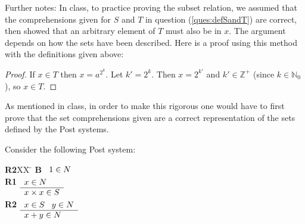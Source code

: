 \documentclass[]{exam}
\theoremstyle{definition}
\newcommand{\bb}[1]{\mathbb{#1}}
\newcommand{\Z}{\bb{Z}}
\newcommand{\N}{\bb{N}}
\begin{document}
\begin{questions}
\begin{parts}
\begin{solution}
Further notes: In class, to practice proving the subset relation, we assumed that the
comprehensions given for $S$ and $T$ in question (\ref{ques:defSandT}) are 
correct, then showed that an arbitrary element of $T$ must also be in $x$.
The argument depends on how the sets have been described. Here is a proof
using this method with the definitions given above:
\begin{proof}
If $x \in T$ then $x = a^{2^k}$. Let $k' = 2^k$. Then $x = 2^{k'}$ and 
$k' \in \Z^+$ (since $k \in \N_0$), so $x \in T$.
\end{proof}
As mentioned in class, in order to make this rigorous one would
have to first prove that the set comprehensions given are a correct representation
of the sets defined by the Post systems.
  
\end{solution}
\end{parts}

\question Consider the following Post system:

\begin{tabbing}
{\bf R2}XX \=  \kill
{\bf B} \>
        \(\begin{array}[t]{l}
        1 \in N
        \end{array}\) \\[2ex]
{\bf R1} \>
        \(\begin{array}[t]{l}
        x \in N \\
        \hline
        x\times x \in S
        \end{array}\)\\[2ex]
{\bf R2} \>
        \(\begin{array}[t]{l}
        x \in S \;\;\; y \in N \\
        \hline
        x+y \in N
        \end{array}\)
\end{tabbing}



\end{questions}
\end{document}
